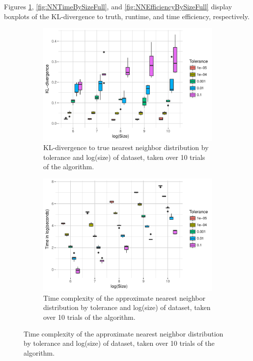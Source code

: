 \documentclass{article}
\begin{document}
Figures \ref{fig:NNDivBySizeFull}, \ref{fig:NNTimeBySizeFull}, and \ref{fig:NNEfficiencyBySizeFull} display boxplots of the KL-divergence to truth, runtime, and time efficiency, respectively.
\begin{figure}
	\begin{subfigure}{0.5\textwidth}
    	\includegraphics[width=\linewidth]{Figures/NearestNeighbor/div_by_size_and_tol.pdf}
    	\caption{KL-divergence to true nearest neighbor distribution by tolerance and log(size) of dataset, taken over 10 trials of the algorithm.}
    	\label{fig:NNDivBySizeFull}
	\end{subfigure}
	\begin{subfigure}{0.5\textwidth}
    	\includegraphics[width=\linewidth]{Figures/NearestNeighbor/time_by_size_and_tol.pdf}
    	\caption{Time complexity of the approximate nearest neighbor distribution by tolerance and log(size) of dataset, taken over 10 trials of the algorithm.}

\end{subfigure}
\end{figure}
\end{document}

